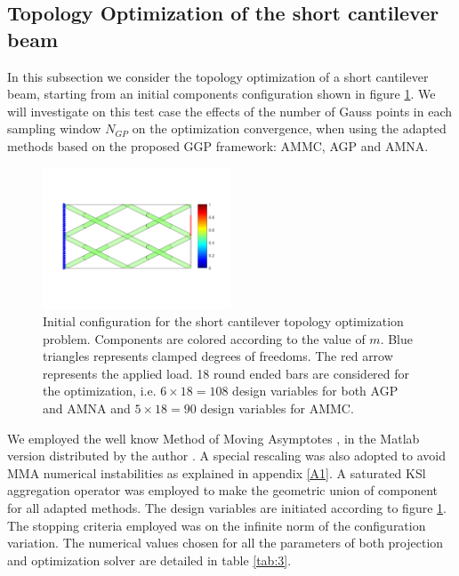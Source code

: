 \subsection{Topology Optimization of the short cantilever beam}
\label{SCB}
In this subsection we consider the topology optimization of a short cantilever beam, starting from an initial components configuration shown in figure \ref{fig:scb}. We will  investigate on this test case the effects of the number of Gauss points in each sampling window $N_{GP}$ on the optimization convergence, when using the adapted methods based on the proposed GGP framework: AMMC, AGP and AMNA.
 \begin{figure}[!ht]
 \centering
  \includegraphics[width=0.5\textwidth]{images/Ch3/component_000.png}
\caption{Initial configuration for the short cantilever topology optimization problem. Components are colored according to the value of $m$. Blue triangles represents clamped degrees of freedoms. The red arrow represents the applied load. 18 round ended bars are considered for the optimization, i.e. $6\times 18=108$ design variables for both AGP and AMNA and $5\times 18=90$ design variables for AMMC.}
\label{fig:scb}       %
\end{figure}
We employed the well know Method of Moving Asymptotes \cite{svanberg1987method}, in the Matlab version distributed by the author \cite{svanberg2004some}. A special rescaling was also adopted to avoid MMA numerical instabilities as explained in appendix \ref{A1}. A saturated KSl aggregation operator was employed to make the geometric union of component for all adapted methods.
The design variables are initiated according to figure \ref{fig:scb}. The stopping criteria employed was on the infinite norm of the configuration variation. The numerical values chosen for all the parameters of both projection and optimization solver are detailed in table \ref{tab:3}. 
